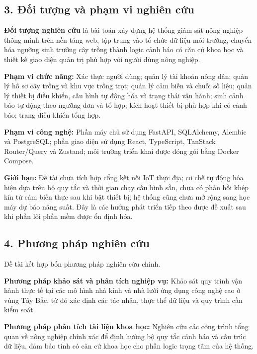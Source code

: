 \documentclass[13pt,a4paper]{extarticle}
\numberwithin{figure}{section}
\numberwithin{table}{section}
\begin{document}
	\subsection*{3. Đối tượng và phạm vi nghiên cứu}
	
	\textbf{Đối tượng nghiên cứu} là bài toán xây dựng hệ thống giám sát nông nghiệp thông minh trên nền tảng web, tập trung vào tổ chức dữ liệu môi trường, chuyển hóa ngưỡng sinh trưởng cây trồng thành logic cảnh báo có căn cứ khoa học và thiết kế giao diện quản trị phù hợp với người dùng nông nghiệp.
	
	\textbf{Phạm vi chức năng:} Xác thực người dùng; quản lý tài khoản nông dân; quản lý hồ sơ cây trồng và khu vực trồng trọt; quản lý cảm biến và chuỗi số liệu; quản lý thiết bị điều khiển, cấu hình tự động hóa và trạng thái vận hành; sinh cảnh báo tự động theo ngưỡng đơn và tổ hợp; kích hoạt thiết bị phù hợp khi có cảnh báo; trang điều khiển tổng hợp.
	
	\textbf{Phạm vi công nghệ:} Phần máy chủ sử dụng FastAPI, SQLAlchemy, Alembic và PostgreSQL; phần giao diện sử dụng React, TypeScript, TanStack Router/Query và Zustand; môi trường triển khai được đóng gói bằng Docker Compose.
	
	\textbf{Giới hạn:} Đề tài chưa tích hợp cổng kết nối IoT thực địa; cơ chế tự động hóa hiện dựa trên bộ quy tắc và thời gian chạy cấu hình sẵn, chưa có phản hồi khép kín từ cảm biến thực sau khi bật thiết bị; hệ thống cũng chưa mở rộng sang học máy dự báo năng suất. Đây là các hướng phát triển tiếp theo được đề xuất sau khi phần lõi phần mềm được ổn định hóa.
	
	\subsection*{4. Phương pháp nghiên cứu}
	
	Đề tài kết hợp bốn phương pháp nghiên cứu chính.
	
	\textbf{Phương pháp khảo sát và phân tích nghiệp vụ:} Khảo sát quy trình vận hành thực tế tại các mô hình nhà kính và nhà lưới ứng dụng công nghệ cao ở vùng Tây Bắc, từ đó xác định các tác nhân, thực thể dữ liệu và quy trình cần kiểm soát.
	
	\textbf{Phương pháp phân tích tài liệu khoa học:} Nghiên cứu các công trình tổng quan về nông nghiệp chính xác \cite{soussi2024,koksal2019,ojha2015,wolfert2017,goap2018} để định hướng bộ quy tắc cảnh báo và cấu trúc dữ liệu, đảm bảo tính có căn cứ khoa học cho phần logic trọng tâm của hệ thống.
	
\end{document}
